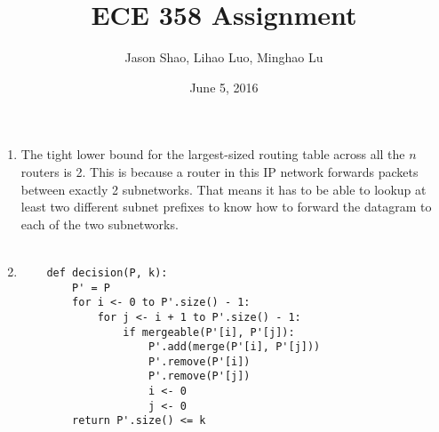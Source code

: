 \documentclass[12pt]{article}
\title{ECE 358 Assignment }
\author{Jason Shao, Lihao Luo, Minghao Lu}
\date{June 5, 2016}
\begin{document}
\maketitle
\renewcommand{\thesubsection}{Problem \arabic{subsection}}


\def\question#1{\item[\bf #1.]}
\def\part#1{\item[\bf #1)]}
\newcommand{\pc}[1]{\mbox{\textbf{#1}}} %

\begin{enumerate}
    \item The tight lower bound for the largest-sized routing table across all the $n$ routers is 2. This is because a router in this IP network forwards packets between exactly 2 subnetworks. That means it has to be able to lookup at least two different subnet prefixes to know how to forward the datagram to each of the two subnetworks. \\ \\
    \item 
    \begin{verbatim}
    def decision(P, k):
        P' = P
        for i <- 0 to P'.size() - 1:
            for j <- i + 1 to P'.size() - 1:
                if mergeable(P'[i], P'[j]):
                    P'.add(merge(P'[i], P'[j]))
                    P'.remove(P'[i])
                    P'.remove(P'[j])
                    i <- 0
                    j <- 0
        return P'.size() <= k    					
    \end{verbatim}
  

\end{enumerate}
\end{document}
